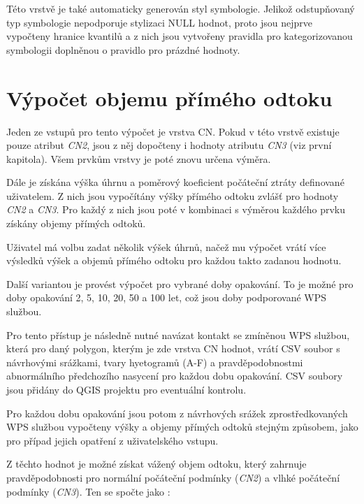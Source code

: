 \documentclass[a4paper,oneside,12pt]{book}
\begin{document}
\hspace{10mm}Této vrstvě je také automaticky generován styl symbologie. Jelikož odstupňovaný typ symbologie nepodporuje stylizaci NULL hodnot, proto jsou nejprve vypočteny hranice kvantilů a z nich jsou vytvořeny pravidla pro kategorizovanou symbologii doplněnou o pravidlo pro prázdné hodnoty.

\section{Výpočet objemu přímého odtoku} \label{runoff}

\hspace{10mm}Jeden ze vstupů pro tento výpočet je vrstva CN. Pokud v této vrstvě existuje pouze atribut \textit{CN2}, jsou z něj dopočteny i hodnoty atributu \textit{CN3} (viz první kapitola). Všem prvkům vrstvy je poté znovu určena výměra.

\hspace{10mm} Dále je získána výška úhrnu a poměrový koeficient počáteční ztráty definované uživatelem. Z nich jsou vypočítány výšky přímého odtoku zvlášť pro hodnoty \textit{CN2} a \textit{CN3}. Pro každý z nich jsou poté v kombinaci s výměrou každého prvku získány objemy přímých odtoků.

\hspace{10mm} Uživatel má volbu zadat několik výšek úhrnů, načež mu výpočet vrátí více výsledků výšek a objemů přímého odtoku pro každou takto zadanou hodnotu.

\hspace{10mm} Další variantou je provést výpočet pro vybrané doby opakování. To je možné pro doby opakování 2, 5, 10, 20, 50 a 100 let, což jsou doby podporované WPS službou. 

\hspace{10mm}Pro tento přístup je následně nutné navázat kontakt se zmíněnou WPS službou, která pro daný polygon, kterým je zde vrstva CN hodnot, vrátí CSV soubor s návrhovými srážkami, tvary hyetogramů (A-F) a pravděpodobnostmi abnormálního předchozího nasycení pro každou dobu opakování. CSV soubory jsou přidány do QGIS projektu pro eventuální kontrolu. 

\hspace{10mm} Pro každou dobu opakování jsou potom z návrhových srážek zprostředkovaných WPS službou vypočteny výšky a objemy přímých odtoků stejným způsobem, jako pro případ jejich opatření z uživatelského vstupu.

\hspace{10mm}Z těchto hodnot je možné získat vážený objem odtoku, který zahrnuje pravděpodobnosti pro normální počáteční podmínky (\textit{CN2}) a vlhké počáteční podmínky (\textit{CN3}). Ten se spočte jako  \cite{MNYDGwleJOjKdRUp} \cite{MNYDGwleJOjKLRU2}:
\end{document}
